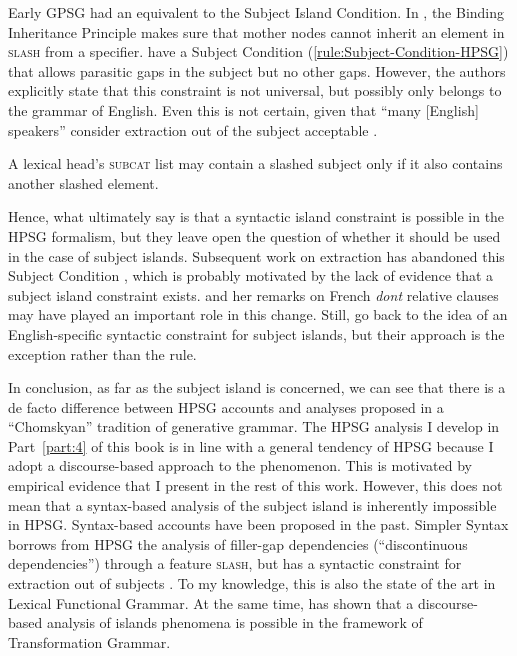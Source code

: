 Early GPSG had an equivalent to the Subject Island Condition. 
In \citet{Pollard.1984}, the Binding Inheritance Principle makes sure that mother nodes cannot inherit an element in \textsc{slash} from a specifier.
\citet{Pollard.1994} have a Subject Condition (\ref{rule:Subject-Condition-HPSG}) that allows parasitic gaps in the subject but no other gaps. However, the authors explicitly state that this constraint is not universal, but possibly only belongs to the grammar of English. Even this is not certain, given that ``many [English] speakers'' consider extraction out of the subject acceptable \citep[183]{Pollard.1994}.

\ea\label{rule:Subject-Condition-HPSG} A lexical head's \textsc{subcat} list may contain a slashed subject only if it also contains another slashed element. \citep[200]{Pollard.1994}
\z 

Hence, what \citeauthor{Pollard.1994} ultimately say is that a syntactic island constraint is possible in the HPSG formalism, but they leave open the question of whether it should be used in the case of subject islands. 
Subsequent work on extraction has abandoned this Subject Condition \citep{Godard.1996,Sag.1997,Bouma.2001,Sag.2010,Chaves.2020.UDC}, which is probably motivated by the lack of evidence that a subject island constraint exists. \citeauthor{Godard.1988} and her remarks on French \emph{dont} relative clauses may have played an important role in this change. Still, \citet{Levine.2003} go back to the idea of an English-specific syntactic constraint for subject islands, but their approach is the exception rather than the rule.


In conclusion, as far as the subject island is concerned, we can see that there is a de facto difference between HPSG accounts and analyses proposed in a ``Chomskyan'' tradition of generative grammar. The HPSG analysis I develop in Part~\ref{part:4} of this book is in line with a general tendency of HPSG because I adopt a discourse-based approach to the phenomenon. This is motivated by empirical evidence that I present in the rest of this work. However, this does not mean that a syntax-based analysis of the subject island is inherently impossible in HPSG. Syntax-based accounts have been proposed in the past. Simpler Syntax borrows from HPSG the analysis of filler-gap dependencies (``discontinuous dependencies'') through a feature \textsc{slash}, but has a syntactic constraint for extraction out of subjects \citep[332]{Culicover.2005}. To my knowledge, this is also the state of the art in Lexical Functional Grammar. 
At the same time, \citet{Erteschik-Shir.1973} has shown that a discourse-based analysis of islands phenomena is possible in the framework of Transformation Grammar.
